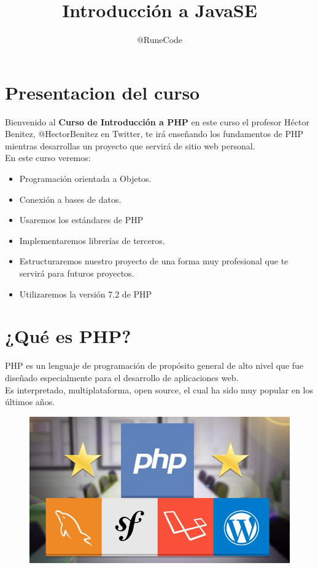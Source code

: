 \documentclass{article}
\title{Introducción a JavaSE}
\author{@RuneCode}
\begin{document}


\section{Presentacion del curso}%
Bienvenido al \textbf{Curso de Introducción a PHP} en este curso el profesor
Héctor Benitez, @HectorBenitez en Twitter, te irá enseñando los fundamentos de
PHP mientras desarrollas un proyecto que servirá de sitio web personal.\\

En este curso veremos:
\begin{itemize}
  \item Programación orientada a Objetos.
  \item Conexión a bases de datos.
  \item Usaremos los estándares de PHP
  \item Implementaremos librerías de terceros.
  \item Estructuraremos nuestro proyecto de una forma muy profesional que te
    servirá para futuros proyectos.
  \item Utilizaremos la versión 7.2 de PHP
\end{itemize}

\section{¿Qué es PHP?}%
PHP es un lenguaje de programación de propósito general de alto nivel que fue
diseñado especialmente para el desarrollo de aplicaciones web.\\

Es interpretado, multiplataforma, open source, el cual ha sido muy popular en
los últimos años.\\

\begin{figure}[h!]
  \centering
  \includegraphics[scale=0.5]{./Pictures/001_php_laravel_sf_wp.jpg}
\end{figure}
\end{document}
